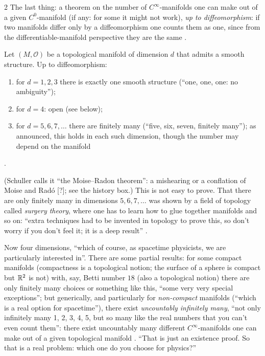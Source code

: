 \begin{paracol}{2}
The last thing: a theorem on the number of $C^\infty$-manifolds one can make out of a given $C^0$-manifold (if any: for some it might not work), \emph{up to diffeomorphism}: if two manifolds differ only by a diffeomorphism one counts them as one, since from the differentiable-manifold perspective they are the same
.

\begin{theorem}\label{thm:c04-count}
Let $(M,\mathcal O)$ be a topological manifold of dimension $d$ that admits a smooth structure. Up to diffeomorphism:
\begin{enumerate}
  \item for $d=1,2,3$ there is exactly one smooth structure (``one, one, one: no ambiguity'');
  \item for $d=4$: open (see below);
  \item for $d=5,6,7,\dots$ there are finitely many (``five, six, seven, finitely many''); as announced, this holds in each such dimension, though the number may depend on the manifold
\end{enumerate}
.
\end{theorem}
(Schuller calls it ``the Moise--Radon theorem'': a mishearing or a conflation of Moise and Rad\'o [?]; see the history box.) This is not easy to prove. That there are only finitely many in dimensions $5,6,7,\dots$ was shown by a field of topology called \emph{surgery theory}, where one has to learn how to glue together manifolds and so on: ``extra techniques had to be invented
in topology to prove this, so don't worry if you don't feel it; it is a deep result'' .

Now four dimensions, ``which of course, as spacetime physicists, we are particularly interested in''. There are some partial results: for some compact manifolds (compactness is a topological notion; the surface of a sphere is compact but $\mathbb{R}^2$ is not) with, say, Betti number $18$ (also a topological notion)
there are only finitely many choices or something like this, ``some very very special exceptions''; but generically, and particularly for \emph{non-compact} manifolds (``which is a real option for spacetime''), there exist \emph{uncountably infinitely many}, ``not only infinitely many 1, 2, 3, 4, 5, but so many like the real numbers that you can't even count them'':
there exist uncountably many different $C^\infty$-manifolds one can make out of a given topological manifold . ``That is just an existence proof. So that is a real problem: which one do you choose for physics?''


\end{paracol}
